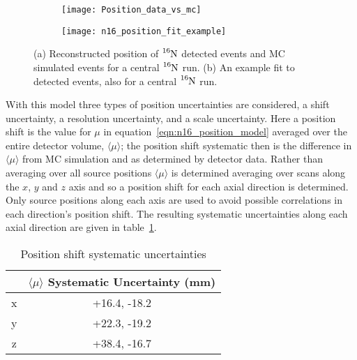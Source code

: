 \begin{figure}[htbp]
\centering
    \begin{subfigure}{0.49\textwidth}
        \centering
        \texttt{[image: Position\_data\_vs\_mc]}
        \caption{}
    \end{subfigure}
    \begin{subfigure}{0.49\textwidth}
        \centering
        \texttt{[image: n16\_position\_fit\_example]}
        \caption{}
    \end{subfigure}
\caption[Reconstructed Postion for $\ce{^{16}N}$ events, Data and MC]{
    (a) Reconstructed position of $\ce{^{16}N}$ detected events and MC simulated
    events for a central $\ce{^{16}N}$ run. (b) An example fit to detected events,
    also for a central $\ce{^{16}N}$ run.}
\label{fig:n16_position_comparison}
\end{figure}

With this model three types of position uncertainties are considered, a shift
uncertainty, a resolution uncertainty, and a scale uncertainty.
Here a position shift is the value for $\mu$ in equation~\eqref{eqn:n16_position_model}
averaged over the entire detector volume, $\langle \mu \rangle$;
the position shift systematic then is the difference in $\langle \mu \rangle$
from MC simulation and as determined by detector data.
Rather than averaging over all source positions $\langle \mu \rangle$
is determined averaging over scans along the $x$, $y$ and $z$ axis and
so a position shift for each axial direction is determined.
Only source positions along each axis are used to avoid possible correlations
in each direction's position shift. The resulting systematic uncertainties along
each axial direction are given in table~\ref{tbl:position_shift_systs}.
\begin{table}
    \centering
    \begin{tabular}{|c|c|}
            \hline
            &$\langle \mu \rangle$ Systematic Uncertainty (mm)\\
            \hline
            x&+16.4, -18.2\\
            y&+22.3, -19.2\\
            z&+38.4, -16.7\\
            \hline
    \end{tabular}
    \caption{Position shift systematic uncertainties}
    \label{tbl:position_shift_systs}
\end{table}

